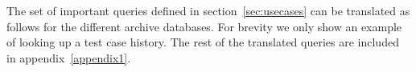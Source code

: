 The set of important queries defined in section~\ref{sec:usecases} can be translated as follows for the different archive databases. For brevity we only show an example of looking up a test case history. The rest of the translated queries are included in appendix~\ref{appendix1}.

%
%
%
%
%
%
%


